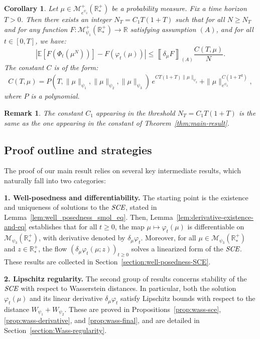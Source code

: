 \documentclass[11pt,a4paper]{article}
\newcommand{\RR}{\mathbb{R}}
\newcommand{\RRP}{\mathbb{R}^+_*}
\newcommand{\MC}{\mathcal{M}}
\newcommand{\SCE}{\emph{SCE}}
\newcommand{\A}{(A)}
\newcommand{\Proc}[1]{\left(#1\right)_{t\geq 0}}
\newtheorem{remark}[theorem]{Remark}
\newtheorem{corollary}[theorem]{Corollary}
\begin{document}
\begin{corollary}\label{thm:main-result-2}
    Let $\mu \in \MC^+_{e^{\psi_2}}(\RRP)$ be a probability measure. Fix a time horizon $T > 0$. Then there exists an integer $N_T = C_1T(1 + T)$ such that for all $N \geq N_T$ and for any function \(F : \MC^+_{\psi_1}(\RRP) \to \RR\) satisfying assumption \(\A\), and for all \(t \in [0, T]\), we have:
    \[
    \left| \mathbb{E}\left[F\left(\Phi_t\left(\mu^N\right)\right)\right] - F\left(\varphi_t(\mu)\right) \right| \leq \left\llbracket \delta_\mu F \right\rrbracket_{\A}  \frac{C\left(T, \mu\right)}{N}.
    \]
    The constant $C$ is of the form:
    \begin{align*}
        C(T,\mu) = P(T,\|\mu\|_{\psi_1},\|\mu\|_{\psi_2},\|\mu\|_{\psi_3})\, e^{CT(1 + T)\|\mu\|_{\psi_2}} + \|\mu\|_{e^{\psi_2}}^{C(1 + T^2)},
    \end{align*}
    where $P$ is a polynomial.
\end{corollary}

\begin{remark}
    The constant $C_1$ appearing in the threshold $N_T = C_1T(1 + T)$ is the same as the one appearing in the constant of Theorem~\ref{thm:main-result}.
\end{remark}



\subsection{Proof outline and strategies}
The proof of our main result relies on several key intermediate results, which naturally fall into two categories:

\textbf{1. Well-posedness and differentiability.} The starting point is the existence and uniqueness of solutions to the $\SCE$, stated in Lemma~\ref{lem:well_posedness_smol_eq}. Then, Lemma~\ref{lem:derivative-existence-and-eq} establishes that for all $t \geq 0$, the map $\mu \mapsto \varphi_t(\mu)$ is differentiable on $\MC_{\psi_3}(\RRP)$, with derivative denoted by $\delta_\mu \varphi_t$. Moreover, for all $\mu \in \MC_{\psi_3}(\RRP)$ and $z \in \RRP$, the flow $\Proc{\delta_\mu \varphi_t(\mu;z)}$ solves a linearized form of the $\SCE$. These results are collected in Section~\ref{section:well-posedness-SCE}.

\textbf{2. Lipschitz regularity.} The second group of results concerns stability of the $\SCE$ with respect to Wasserstein distances. In particular, both the solution $\varphi_t(\mu)$ and its linear derivative $\delta_\mu \varphi_t$ satisfy Lipschitz bounds with respect to the distance $W_{\psi_1} + W_{\psi_2}$. These are proved in Propositions~\ref{prop:wass-sce}, \ref{prop:wass-derivative}, and \ref{prop:wass-final}, and are detailed in Section~\ref{section:Wass-regularity}.
\end{document}
